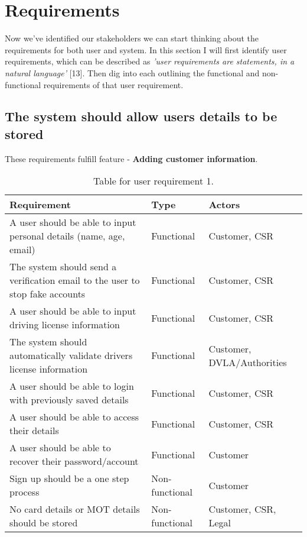 \section{Requirements}
  Now we've identified our stakeholders we can start thinking about the requirements for both user and system. In this section I will first identify user
  requirements, which can be described as \textit{'user requirements are statements, in a natural language'} [13].
  Then dig into each outlining the functional and non-functional requirements of that user requirement.

  \subsection{The system should allow users details to be stored}
  These requirements fulfill feature - \textbf{Adding customer information}.
    \begin{table}[H]
      \centering
      \begin{tabular}{|p{}|p{}|p{}|}
        \hline
        Requirement & Type & Actors \\ \hline
        A user should be able to input personal details (name, age, email) & Functional & Customer, CSR \\ \hline
        The system should send a verification email to the user to stop fake accounts & Functional & Customer, CSR \\ \hline
        A user should be able to input driving license information & Functional & Customer, CSR \\ \hline
        The system should automatically validate drivers license information & Functional & Customer, DVLA/Authorities \\ \hline
        A user should be able to login with previously saved details & Functional & Customer, CSR \\ \hline
        A user should be able to access their details & Functional & Customer, CSR \\ \hline
        A user should be able to recover their password/account & Functional  & Customer \\ \hline
        Sign up should be a one step process & Non-functional & Customer \\ \hline
        No card details or MOT details should be stored & Non-functional & Customer, CSR, Legal \\ \hline
      \end{tabular}
      \caption{Table for user requirement 1.}
    \end{table}

